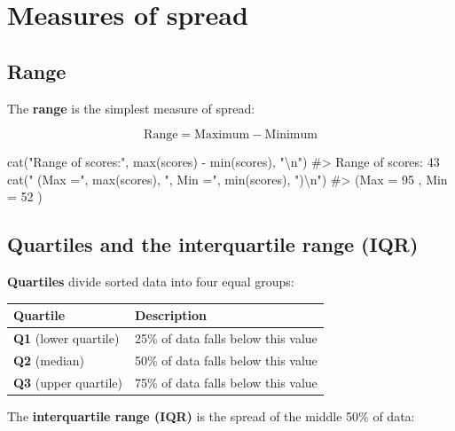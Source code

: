 \documentclass[
  11pt,
  a4paper,
  oneside,
  open=any]{scrbook}
\newenvironment{Shaded}{\begin{snugshade}}{\end{snugshade}}
\newcommand{\CommentTok}[1]{\textcolor[rgb]{0.37,0.37,0.37}{#1}}
\newcommand{\FunctionTok}[1]{\textcolor[rgb]{0.28,0.35,0.67}{#1}}
\newcommand{\NormalTok}[1]{\textcolor[rgb]{0.00,0.23,0.31}{#1}}
\newcommand{\SpecialCharTok}[1]{\textcolor[rgb]{0.37,0.37,0.37}{#1}}
\newcommand{\StringTok}[1]{\textcolor[rgb]{0.13,0.47,0.30}{#1}}
\begin{document}
\section{Measures of spread}\label{measures-of-spread}

\subsection{Range}\label{range}

The \textbf{range} is the simplest measure of spread:

\[\text{Range} = \text{Maximum} - \text{Minimum}\]

\begin{Shaded}
\begin{Highlighting}[]
\FunctionTok{cat}\NormalTok{(}\StringTok{"Range of scores:"}\NormalTok{, }\FunctionTok{max}\NormalTok{(scores) }\SpecialCharTok{{-}} \FunctionTok{min}\NormalTok{(scores), }\StringTok{"}\SpecialCharTok{\textbackslash{}n}\StringTok{"}\NormalTok{)}
\CommentTok{\#\textgreater{} Range of scores: 43}
\FunctionTok{cat}\NormalTok{(}\StringTok{"  (Max ="}\NormalTok{, }\FunctionTok{max}\NormalTok{(scores), }\StringTok{", Min ="}\NormalTok{, }\FunctionTok{min}\NormalTok{(scores), }\StringTok{")}\SpecialCharTok{\textbackslash{}n}\StringTok{"}\NormalTok{)}
\CommentTok{\#\textgreater{}   (Max = 95 , Min = 52 )}
\end{Highlighting}
\end{Shaded}

\subsection{Quartiles and the interquartile range
(IQR)}\label{quartiles-and-the-interquartile-range-iqr}

\textbf{Quartiles} divide sorted data into four equal groups:

\begin{longtable}[]{@{}ll@{}}
\toprule\noalign{}
Quartile & Description \\
\midrule\noalign{}
\endhead
\bottomrule\noalign{}
\endlastfoot
\textbf{Q1} (lower quartile) & 25\% of data falls below this value \\
\textbf{Q2} (median) & 50\% of data falls below this value \\
\textbf{Q3} (upper quartile) & 75\% of data falls below this value \\
\end{longtable}

The \textbf{interquartile range (IQR)} is the spread of the middle 50\%
of data:
\end{document}
